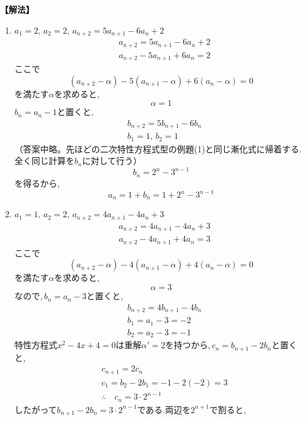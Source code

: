     \noindent\textbf{【解法】}
    \begin{enumerate}[label=(\arabic*),parsep=3pt]
      \item $\displaystyle a_1=2,\,a_2=2,\, a_{n+2}=5a_{n+1}-6a_n+2$
            \begin{align*}
              &a_{n+2}=5a_{n+1}-6a_n+2\\
              &a_{n+2}-5a_{n+1}+6a_n=2
            \end{align*}
            ここで
            \[
              (a_{n+2}-\alpha)-5(a_{n+1}-\alpha)+6(a_n-\alpha)=0 
            \]
            を満たす$\alpha$を求めると,
            \[
              \alpha=1
            \]
            $b_n=a_n-1$と置くと,
            \begin{align*}
              &b_{n+2}=5b_{n+1}-6b_n\\
              &b_1=1,\, b_2=1
            \end{align*}
            （答案中略。先ほどの二次特性方程式型の例題(1)と同じ漸化式に帰着する.全く同じ計算を$b_n$に対して行う）
            \[
              b_n=2^n-3^{n-1}
            \]
            を得るから,
            \[
              a_n=1+b_n=1+2^n-3^{n-1}
            \]
      \item $\displaystyle a_1=1,\,a_2=2,\, a_{n+2}=4a_{n+1}-4a_n+3$
            \begin{align*}
              &a_{n+2}=4a_{n+1}-4a_n+3\\
              &a_{n+2}-4a_{n+1}+4a_n=3
            \end{align*}
            ここで
            \[
              (a_{n+2}-\alpha)-4(a_{n+1}-\alpha)+4(a_n-\alpha)=0 
            \]
            を満たす$\alpha$を求めると,
            \[
              \alpha=3
            \]
            なので,\,$b_n=a_n-3$と置くと,
            \begin{align*}
              &b_{n+2}=4b_{n+1}-4b_n\\
              &b_1=a_1-3=-2\\
              &b_2=a_2-3=-1                
            \end{align*}
            特性方程式$x^2-4x+4=0$は重解$\alpha'=2$を持つから,\,$c_n=b_{n+1}-2b_n$と置くと,
            \begin{align*}
              &c_{n+1}=2c_n\\
              &c_1=b_2-2b_1=-1-2(-2)=3\\
              &\therefore \quad c_n=3\cdot2^{n-1}
            \end{align*}
            したがって$b_{n+1}-2b_n=3\cdot2^{n-1}$である.両辺を$2^{n+1}$で割ると,

\end{enumerate}
